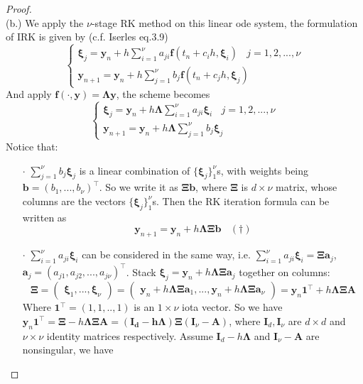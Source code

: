 \documentclass[a4paper, 10pt]{article}
\theoremstyle{definition}
\theoremstyle{hSol}
\begin{document}
\begin{proof}
~\\
(b.) We apply the $\nu$-stage RK method on this linear ode system, the formulation of IRK is given by (c.f. Iserles eq.3.9)
\begin{equation}
  \begin{cases}
    \bm{\xi}_j = \bm{y}_n + h\sum_{i=1}^{\nu} a_{ji} \bm{f}(t_n+c_ih , \bm{\xi}_i)~~~~j=1,2,...,\nu \\
    \bm{y}_{n+1} = \bm{y}_n + h\sum_{j=1}^{\nu} b_j \bm{f}(t_n+c_j h, \bm{\xi}_j)
  \end{cases}
\end{equation}
And apply $\bm{f}(\cdot, \bm{y}) = \bm{\Lambda} \bm{y}$, the scheme becomes
\begin{equation}
    \begin{cases}
    \bm{\xi}_j = \bm{y}_n + h \bm{\Lambda}\sum_{i=1}^{\nu} a_{ji} \bm{\xi}_i~~~~j=1,2,...,\nu \\
    \bm{y}_{n+1} = \bm{y}_n + h \bm{\Lambda}\sum_{j=1}^{\nu} b_j \bm{\xi}_j
  \end{cases}
\end{equation}
Notice that:
\begin{itemize}
  \item[$\cdot$] $\sum_{j=1}^{\nu} b_j \bm{\xi}_j$ is a linear combination of $\{\bm{\xi}_j\}_1^{\nu}$s, with weights being $\bm{b}=(b_1, ..., b_{\nu})^{\top}$. So we write it as $\bm{\Xi}\bm{b}$, where $\bm{\Xi}$ is $d\times \nu$ matrix, whose columns are the vectors $\{\bm{\xi}_j\}_1^{\nu}$s. Then the RK iteration formula can be written as
  $$
  \bm{y}_{n+1} = \bm{y}_n + h \bm{\Lambda} \bm{\Xi} \bm{b}~~~~(\dag)
  $$
  \item[$\cdot$] $\sum_{i=1}^{\nu} a_{ji} \bm{\xi}_i$ can be considered in the same way, i.e. $\sum_{i=1}^{\nu} a_{ji} \bm{\xi}_i = \bm{\Xi}\bm{a}_j$, $\bm{a}_j = (a_{j1}, a_{j2}, ..., a_{j\nu})^{\top}$. Stack $\bm{\xi}_j = \bm{y}_n + h \bm{\Lambda}\bm{\Xi}\bm{a}_j$ together on columns:
  \begin{equation} \bm{\Xi} = 
    \begin{pmatrix}
      \bm{\xi}_1, ..., \bm{\xi}_{\nu}
    \end{pmatrix} = 
    \begin{pmatrix}
      \bm{y}_n + h \bm{\Lambda}\bm{\Xi}\bm{a}_1, ...,\bm{y}_n + h \bm{\Lambda}\bm{\Xi}\bm{a}_{\nu}
    \end{pmatrix} = \bm{y}_n \bm{1}^{\top} + h \bm{\Lambda}\bm{\Xi} \bm{A}
  \end{equation}
  Where $\bm{1}^{\top} = (1,1,..,1)$ is an $1\times \nu$ iota vector. So we have $ \bm{y}_n \bm{1}^{\top}  = \bm{\Xi} - h \bm{\Lambda}\bm{\Xi} \bm{A} = (\bm{I_d-h \bm{\Lambda}}) \bm{\Xi} (\bm{I}_{\nu}-\bm{A})$, where $\bm{I}_d, \bm{I}_{\nu}$ are $d\times d$ and $\nu \times\nu$ identity matrices respectively. Assume $\bm{I}_d-h \bm{\Lambda}$ and $\bm{I}_{\nu}-\bm{A}$ are nonsingular, we have

\end{itemize}
\end{proof}
\end{document}
